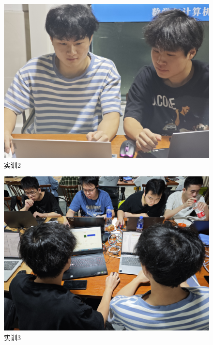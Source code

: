 \documentclass{textreportclass}  %
\begin{document}
	\begin{figure}[htbp]
		\centering
		\includegraphics[scale=0.1]{Fig/2.jpg}
		\caption{实训2}\label{Fig.43}
	\end{figure}
	
	\begin{figure}[htbp]
		\centering
		\includegraphics[scale=0.1]{Fig/3.jpg}
		\caption{实训3}\label{Fig.44}
	\end{figure}
	
\end{document}
